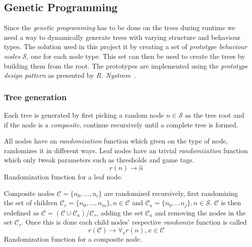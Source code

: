 \documentclass[a4paper, twocolumn]{article}
\begin{document}
        \clearpage

        \subsection{Genetic Programming} \label{sec:genetic_programming_implementation}

        Since the \textit{genetic programming} has to be done on the trees during runtime we need a way to dynamically generate trees with varying structure and behaviour types. The solution used in this project it by creating a set of \textit{prototype behaviour nodes} \(\mathcal{S}\), one for each node type. This set can then be used to create the trees by building them from the root. The prototypes are implemented using the \textit{prototype design pattern} as presented by \textit{R. Nystrom}~\cite{nystrom2014game}.

        \subsubsection*{Tree generation}

        Each tree is generated by first picking a random node \(n \in \mathcal{S}\) as the tree root and if the node is a \textit{composite}, continue recursively until a complete tree is formed.

        All nodes have an \textit{randomization} function which given on the type of node, randomizes it in different ways. Leaf nodes have an trivial \textit{randomization} function which only tweak parameters such as thresholds and game tags.
        \begin{equation}
        \label{eq:leaf-randomization}
            r(n) \rightarrow \hat{n}
        \end{equation}
        Randomization function for a leaf node.


        Composite nodes \(\mathcal{C} = \{n_0,...,n_i\}\) are randomized recursively, first randomizing the set of children \(\mathcal{C}_r = \{n_0,...,n_m\}, n \in \mathcal{C}\) and \(\mathcal{C}_a = \{n_0,...n_j\}, n \in \mathcal{S}\). \(\mathcal{C}\) is then redefined as \(\mathcal{C} = (\mathcal{C} \cup \mathcal{C}_a)/ \mathcal{C}_r \), adding the set \(\mathcal{C}_a\) and removing the nodes in the set \(\mathcal{C}_r\). Once this is done each child nodes' respective \textit{randomize} function is called 
        \begin{equation}
        \label{eq:composite-randomlization}
            r(\mathcal{C}) \rightarrow \forall_{x} r(n),x \in \mathcal{C}
        \end{equation}
         Randomization function for a composite node.
\end{document}
